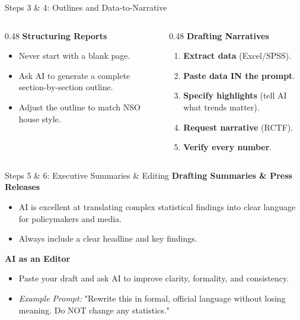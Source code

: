 \documentclass[aspectratio=169]{beamer}
\begin{document}
\begin{frame}{Steps 3 \& 4: Outlines and Data-to-Narrative}
    \begin{columns}[T]
        \begin{column}{0.48\textwidth}
            \textbf{Structuring Reports}
            \begin{itemize}
                \item Never start with a blank page.
                \item Ask AI to generate a complete section-by-section outline.
                \item Adjust the outline to match NSO house style.
            \end{itemize}
        \end{column}
        
        \begin{column}{0.48\textwidth}
            \textbf{Drafting Narratives}
            \begin{enumerate}
                \item \textbf{Extract data} (Excel/SPSS).
                \item \textbf{Paste data IN the prompt}.
                \item \textbf{Specify highlights} (tell AI what trends matter).
                \item \textbf{Request narrative} (RCTF).
                \item \textbf{Verify every number}.
            \end{enumerate}
        \end{column}
    \end{columns}
\end{frame}

\begin{frame}{Steps 5 \& 6: Executive Summaries \& Editing}
    \textbf{Drafting Summaries \& Press Releases}
    \begin{itemize}
        \item AI is excellent at translating complex statistical findings into clear language for policymakers and media.
        \item Always include a clear headline and key findings.
    \end{itemize}
    
    \vspace{0.5cm}
    
    \textbf{AI as an Editor}
    \begin{itemize}
        \item Paste your draft and ask AI to improve clarity, formality, and consistency.
        \item \textit{Example Prompt:} "Rewrite this in formal, official language without losing meaning. Do NOT change any statistics."
    \end{itemize}
\end{frame}
\end{document}
